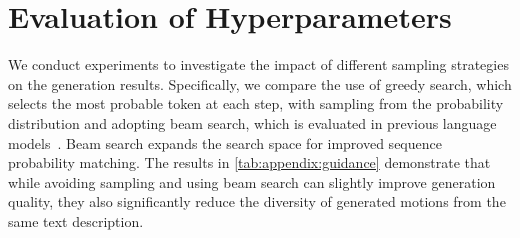 \section{Evaluation of Hyperparameters}
\label{sec:appendix:hyperparameters}
We conduct experiments to investigate the impact of different sampling strategies on the generation results. Specifically, we compare the use of greedy search, which selects the most probable token at each step, with sampling from the probability distribution and adopting beam search, which is evaluated in previous language models~\cite{raffel2020t5}. Beam search expands the search space for improved sequence probability matching. The results in \cref{tab:appendix:guidance} demonstrate that while avoiding sampling and using beam search can slightly improve generation quality, they also significantly reduce the diversity of generated motions from the same text description.

\label{appendix:guidance}

